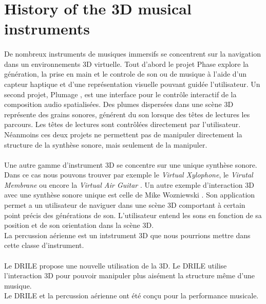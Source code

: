 \section{History of the 3D musical instruments}
\paragraph{}
De nombreux instruments de musiques immersifs se concentrent sur la navigation dans un environnements 3D virtuelle.
Tout d'abord le projet Phase \cite{rodet2005study} explore la génération, la prise en main et le controle de son ou de musique à l'aide d'un capteur haptique et d'une représentation visuelle pouvant guidée l'utilisateur.
Un second projet, Plumage \cite{plumage2007}, est une interface pour le contrôle interactif de la composition audio spatialisées. Des plumes dispersées dans une scène 3D représente des grains sonores, générent du son lorsque des têtes de lectures les parcours. Les têtes de lectures sont contrôlées directement par l'utilisateur.
Néanmoins ces deux projets ne permettent pas de manipuler directement la structure de la synthèse sonore, mais seulement de la manipuler.
\paragraph{}
Une autre gamme d'instrument 3D se concentre sur une unique synthèse sonore. Dans ce cas nous pouvons trouver par exemple le \textit{Virtual Xylophone}, le \textit{Virutal Membrane} ou encore la \textit{Virtual Air Guitar} \cite{maki2005}. Un autre exemple d'interaction 3D avec une synthèse sonore unique est celle de Mike Wozniewski \cite{wozniewski2006spatial}. Son application permet a un utilisateur de naviguer dans une scène 3D comportant à certain point précis des générations de son. L'utilisateur entend les sons en fonction de sa position et de son orientation dans la scène 3D.
\\
La percussion aérienne est un intstrument 3D que nous pourrions mettre dans cette classe d'instrument.
\paragraph{}
Le DRILE propose une nouvelle utilisation de la 3D. Le DRILE utilise l'interaction 3D pour pouvoir manipuler plus aisément la structure même d'une musique.
\\
Le DRILE et la percussion aérienne ont été conçu pour la performance musicale.
